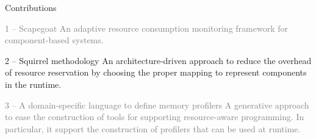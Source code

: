 \documentclass[10pt,xcolor={dvipsnames}]{beamer}
\begin{document}
	\begin{frame}{Contributions}
		\begin{scriptsize}
		\begin{block}{\textcolor{gray}{1 -- Scapegoat}}
			\textcolor{gray}{An adaptive resource consumption monitoring framework for component-based systems.}
		\end{block}
		\end{scriptsize}
		
		\vspace{0.2cm}
			\begin{block}{{\large 2 -- Squirrel methodology}}
				An architecture-driven approach to reduce the overhead of resource reservation by choosing the proper mapping to represent 
				components in the runtime.
			\end{block}
		\vspace{0.2cm}
		\begin{scriptsize}
			\begin{block}{\textcolor{gray}{3 -- A domain-specific language to define memory profilers}}
				\textcolor{gray}{A generative approach to ease the construction of tools for supporting resource-aware programming. In particular, it support the construction of profilers that can be used at runtime.}
			\end{block}
		\end{scriptsize}
		
		
	\end{frame}
	
\end{document}
